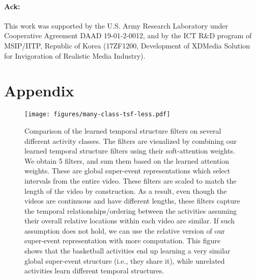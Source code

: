 \documentclass[10pt,twocolumn,letterpaper]{article}
\begin{document}
\vspace{-3pt}
\paragraph{Ack:}

This work was supported by the U.S. Army Research Laboratory under Cooperative Agreement DAAD 19-01-2-0012, and by the ICT R\&D program of MSIP/IITP, Republic of Korea (17ZF1200, Development of XDMedia Solution for Invigoration of Realistic Media Industry).


{\small


}

\clearpage
\appendix
\section{Appendix}






\begin{minipage}{\textwidth}

\begin{figure}[H]
\texttt{[image: figures/many-class-tsf-less.pdf]}
 \caption{Comparison of the learned temporal structure filters on several different activity classes. The filters are visualized by combining our learned temporal structure filters using their soft-attention weights. We obtain 5  filters, and sum them based on the learned attention weights. These are global super-event representations which select intervals from the entire video. These filters are scaled to match the length of the video by construction. As a result, even though the videos are continuous and have different lengths, these filters capture the temporal relationships/ordering between the activities assuming their overall relative locations within each video are similar. If such assumption does not hold, we can use the relative version of our super-event representation with more computation. This figure shows that the basketball activities end up learning a very similar global super-event structure (i.e., they share it), while unrelated activities learn different temporal structures.}
\end{figure}

\end{minipage}
\end{document}
